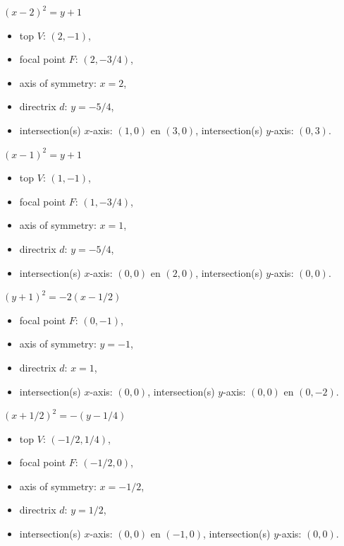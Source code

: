 \begin{Answer}\phantom{}
    
	\Question $(x-2)^2 = y+ 1$
	    \begin{itemize}
	    \item top $V$: $(2,-1)$,
	    \item focal point $F$: $(2,-3/4)$, 
	    \item axis of symmetry: $x=2$,
	    \item directrix $d$: $y=-5/4$,
	    \item intersection(s) $x$-axis: $(1,0)$ en $(3,0)$, \; intersection(s) $y$-axis: $(0,3)$.
	    \end{itemize}
	    
	\Question $(x-1)^2 = y+1$
	    \begin{itemize}
	    \item top $V$: $(1,-1)$,
	    \item focal point $F$: $(1,-3/4)$, 
	    \item axis of symmetry: $x=1$,
	    \item directrix $d$: $y=-5/4$,
	    \item intersection(s) $x$-axis: $(0,0)$ en $(2,0)$, \; intersection(s) $y$-axis: $(0,0)$.
	    \end{itemize}
	
	
	\Question $(y+1)^2 = -2(x - 1/2)$
	    \begin{itemize}
	    \Question top $V$: $(1/2,-1)$,
	    \item focal point $F$: $(0,-1)$, 
	    \item axis of symmetry: $y=-1$,
	    \item directrix $d$: $x=1$,
	    \item intersection(s) $x$-axis: $(0,0)$, \; intersection(s) $y$-axis: $(0,0)$ en $(0,-2)$.
	    \end{itemize}
	
	\Question $(x + 1/2)^2 = -(y - 1/4)  $
	    \begin{itemize}
	    \item top $V$: $(-1/2,1/4)$,
	    \item focal point $F$: $(-1/2,0)$, 
	    \item axis of symmetry: $x=-1/2$,
	    \item directrix $d$: $y=1/2$,
	    \item intersection(s) $x$-axis: $(0,0)$ en $(-1,0)$, \; intersection(s) $y$-axis: $(0,0)$.
	    \end{itemize}


\end{Answer}
